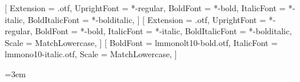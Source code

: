 

\usepackage{fontspec}
\setmainfont{texgyrepagella}[
  Extension = .otf,
  UprightFont = *-regular,
  BoldFont = *-bold,
  ItalicFont = *-italic,
  BoldItalicFont = *-bolditalic,
]
\setsansfont{texgyreheros}[
  Extension = .otf,
  UprightFont = *-regular,
  BoldFont = *-bold,
  ItalicFont = *-italic,
  BoldItalicFont = *-bolditalic,
  Scale = MatchLowercase,
]
\setmonofont{lmmono10-regular.otf}[
  BoldFont = lmmonolt10-bold.otf,
  ItalicFont = lmmono10-italic.otf,
  Scale = MatchLowercase,
]
\linespread{1.06}
\usepackage{microtype}

\usepackage[letterpaper, top=26mm, bottom=28mm, inner=28mm, outer=28mm, headsep=9mm, footskip=12mm]{geometry}
\setlength{\parindent}{0pt}
\setlength{\parskip}{0.55\baselineskip plus 2pt minus 1pt}
\emergencystretch=3em

\usepackage{xcolor}
\color{ink}

